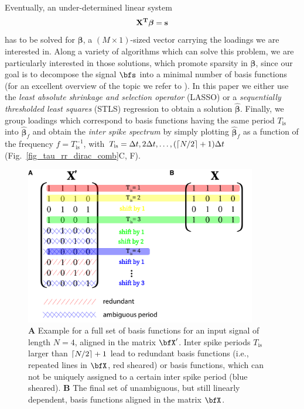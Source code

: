\documentclass[entropy,article,submit,pdftex,moreauthors]{Definitions/mdpi}
\DeclarePairedDelimiter\ceil{\lceil}{\rceil}
\begin{document}
\noindent Eventually, an under-determined linear system
\begin{equation}
\bf{X}^T \boldsymbol\beta=\bf{s}
\label{eq_linear_system}
\end{equation}  
has to be solved for $\boldsymbol\beta$, a $(M\times 1)$-sized vector carrying the loadings we are interested in. Along a variety of algorithms which can solve this problem, we are 
particularly interested in those solutions, which promote sparsity in $\boldsymbol\beta$, since our goal is to decompose the signal $\bfs$ into a minimal number of basis 
functions (for an excellent overview of the topic we refer to \citet{Brunton2019}). In this paper we either use the \textit{least absolute shrinkage and selection operator} 
(LASSO) \cite{Tibshirani1996} or a \textit{sequentially thresholded least squares} (STLS) regression \cite{Brunton2016,Brunton2019} to obtain a solution $\hat{\boldsymbol\beta}$. Finally, we group loadings 
which correspond to basis functions having the same period 
$T_\text{is}$ into $\hat{\boldsymbol\beta}_f$ and obtain the 
\textit{inter spike spectrum} by simply plotting $\hat{\boldsymbol\beta}_f$ as a function of the frequency $f=T_\text{is}^{-1}$, with $T_\text{is}=\Delta t, 2\Delta t, \dots, (\ceil*{N/2}+1) \Delta t$ 
(Fig.~\ref{fig_tau_rr_dirac_comb}C, F).

\begin{figure}
\centering
\includegraphics[width=0.9\textwidth]{./figures/fig_tau_rr_basis_functions}
\caption{\textbf{A} Example for a full set of basis functions for an input signal of length $N=4$, aligned in the matrix $\bfX'$. Inter spike periods $T_{\text{is}}$ larger 
than $\ceil*{N/2}+1$ lead to redundant basis functions (i.e., repeated lines in $\bfX$, red sheared) or basis functions, which can not be uniquely assigned to a certain inter spike period 
(blue sheared). \textbf{B} The final set of unambiguous, but still linearly dependent, basis functions aligned in the matrix $\bfX$.} \label{fig_tau_rr_basis_functions}
\end{figure}
\end{document}

